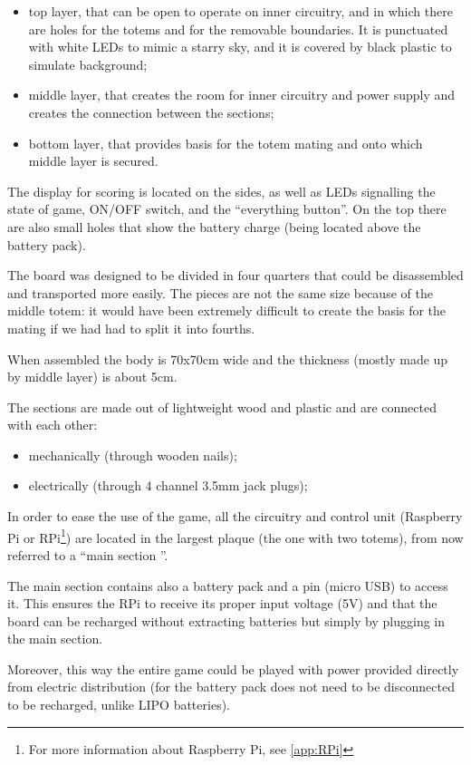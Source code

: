 \documentclass[a4paper,twoside]{book}
\begin{document}
\begin{itemize}
\item top layer, that can be open to operate on inner circuitry, and in which there are holes for the totems and for the removable boundaries. It is punctuated with white LEDs to mimic a starry sky, and it is covered by black plastic to simulate background;
\item middle layer, that creates the room for inner circuitry and power supply and creates the connection between the sections;
\item bottom layer, that provides basis for the totem mating and onto which middle layer is secured.
\end{itemize}
The display for scoring is located on the sides, as well as LEDs signalling the state of game, ON/OFF switch, and the \textquotedblleft everything button\textquotedblright. On the top there are also small holes that show the battery charge (being located above the battery pack).

The board was designed to be divided in four quarters that could be disassembled and transported more easily. The pieces are not the same size because of the middle totem: it would have been extremely difficult to create the basis for the  mating if we had had to split it into fourths.

When assembled the body is 70x70cm wide and the thickness (mostly made up by middle layer) is about 5cm.

The sections are made out of lightweight wood and plastic and are connected with each other:
\begin{itemize}
\item mechanically (through wooden nails);
\item electrically (through 4 channel 3.5mm jack plugs);
\end{itemize}
In order to ease the use of the game, all the circuitry and control unit (Raspberry Pi or RPi\footnote{For more information about Raspberry Pi, see \autoref{app:RPi}}) are located in the largest plaque (the one with two totems), from now referred to a \textquotedblleft main section \textquotedblright.

The main section contains also a battery pack and a pin (micro USB) to access it. This ensures the RPi to receive its proper input voltage (5V) and that the board can be recharged without extracting batteries but simply by plugging in the main section.

Moreover, this way the entire game could be played with power provided directly from electric distribution (for the battery pack does not need to be disconnected to be recharged, unlike LIPO batteries).
\end{document}
